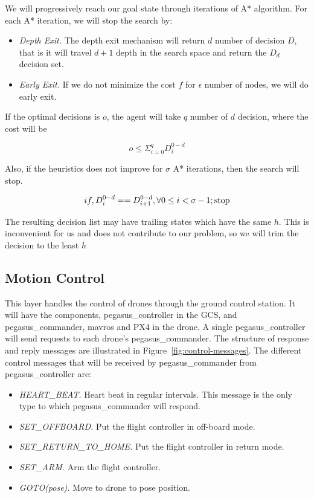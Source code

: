 We will progressively reach our goal state through iterations of A* algorithm. For each A* iteration, we will stop the search by:
\begin{itemize}
	\item \textit{Depth Exit.} The depth exit mechanism will return $d$ number of decision $D$, that is it will travel $d+1$ depth in the search space and return the $D_d$ decision set. 
	\item \textit{Early Exit.} If we do not minimize the cost $f$ for  $\epsilon$ number of nodes, we will do early exit.
	
\end{itemize}

If the optimal decisions is $o$, the agent will take $q$ number of $d$ decision, where the cost will be

$$o \le \Sigma_{i=0}^q D^{0-d}_i$$

Also, if the heuristics does not improve for $\sigma$ A* iterations, then the search will stop.

$$ if, D^{0-d}_i == D^{0-d}_{i+1}, \forall \space 0 \le i < \sigma - 1; \text{stop}$$

The resulting decision list may have trailing states which have the same $h$. This is inconvenient for us and does not contribute to our problem, so we will trim the decision to the least $h$

\subsection{Motion Control}

This layer handles the control of drones through the ground control station. It will have the components, pegasus\_controller in the GCS, and pegasus\_commander, mavros and PX4 in the drone. A single pegasus\_controller will send requests to each drone's pegasus\_commander. The structure of response and reply messages are illustrated in Figure~\ref{fig:control-messages}. 
The different control messages that will be received by pegasus\_commander from pegasus\_controller are:
\begin{itemize}
	\item \textit{HEART\_BEAT.} Heart beat in regular intervals. This message is the only type to which pegasus\_commander will respond.
	\item \textit{SET\_OFFBOARD.} Put the flight controller in off-board mode.
	\item \textit{SET\_RETURN\_TO\_HOME.} Put the flight controller in return mode.
	\item \textit{SET\_ARM.} Arm the flight controller.
	\item \textit{GOTO(pose). } Move to drone to pose position.
\end{itemize}


